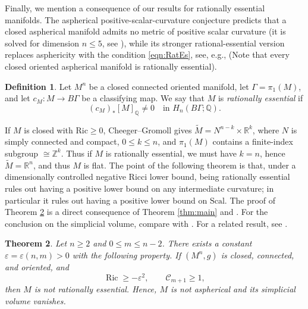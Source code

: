 \documentclass[11pt]{amsart}
\newtheorem{theorem}{Theorem}[section]
\theoremstyle{definition}
\newtheorem{definition}[theorem]{Definition}
\theoremstyle{remark}
\DeclareMathOperator{\Ric}{Ric}
\begin{document}
Finally, we mention a consequence of our results for rationally essential manifolds. The aspherical
positive-scalar-curvature conjecture predicts that a closed aspherical
manifold admits no metric of positive scalar curvature (it is solved for dimension $n\leq 5$, see \cite{ChodoshLiAspherical, GromovAspherical5}), while its stronger
rational-essential version replaces asphericity with the
condition \eqref{eqn:RatEs}, see, e.g., \cite[Section 3.2]{GromovFourLectures} (Note that every closed oriented
aspherical manifold is rationally essential).
\begin{definition}
Let $M^n$ be a closed connected oriented manifold, let
$\Gamma=\pi_1(M)$, and let $c_M\colon M\to B\Gamma$ be a classifying
map.  We say that $M$ is \emph{rationally essential} if
\begin{equation}\label{eqn:RatEs}
                     (c_M)_*[M]_{\mathbb Q}\neq 0
                     \quad\text{in }H_n(B\Gamma;\mathbb Q).
\end{equation}
\end{definition}

If $M$ is closed with $\mathrm{Ric}\geq 0$, Cheeger--Gromoll \cite{CheegerGromoll} gives $\widetilde M=N^{n-k}\times\mathbb R^k$, where $N$ is simply connected and compact, $0\leq k\leq n$, and $\pi_1(M)$ contains a finite-index subgroup $\cong \mathbb Z^k$. Thus if $M$ is rationally essential, we must have $k=n$, hence $\widetilde M=\mathbb R^n$,
and thus $M$ is flat.  The point of the following theorem is that, under a dimensionally controlled negative Ricci lower bound, being rationally essential rules out having a positive lower bound on any intermediate curvature; in particular it rules out having a positive lower bound on $\mathrm{Scal}$. The proof of Theorem \ref{prop:rationally-inessential} is a direct consequence of Theorem \ref{thm:main} and \cite[Theorem 1.3]{BraunSauer2021}. For the conclusion on the simplicial volume, compare with \cite[Section 3.A.]{GromovLarge}. For a related result, see \cite[Corollary 2.7]{Lott2025}.
\begin{theorem}\label{prop:rationally-inessential}
Let $n\geq2$ and $0\leq m\leq n-2$.  There exists a constant
$\varepsilon=\varepsilon(n,m)>0$ with the following property.  If
$(M^n,g)$ is closed, connected, and oriented, and 
\[
        \Ric\geq-\varepsilon^2,
        \qquad \mathcal C_{m+1}\geq 1,
\]
then $M$ is not rationally essential.  Hence, $M$ is not
aspherical and its simplicial volume vanishes.
\end{theorem}
\end{document}
